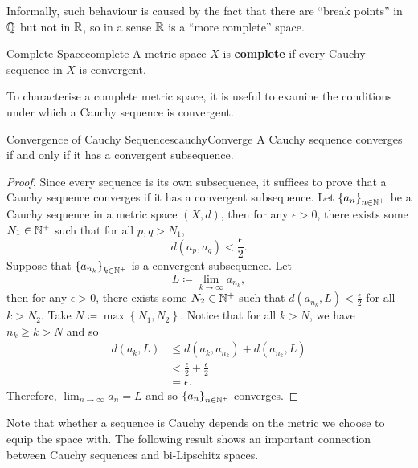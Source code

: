 \documentclass[math]{amznotes}
\theoremstyle{remark}
\begin{document}
Informally, such behaviour is caused by the fact that there are ``break points'' in $\mathbb{Q}$ but not in $\mathbb{R}$, so in a sense $\mathbb{R}$ is a ``more complete'' space.
\begin{dfnbox}{Complete Space}{complete}
    A metric space $X$ is {\color{red} \textbf{complete}} if every Cauchy sequence in $X$ is convergent.
\end{dfnbox}
To characterise a complete metric space, it is useful to examine the conditions under which a Cauchy sequence is convergent. 
\begin{probox}{Convergence of Cauchy Sequences}{cauchyConverge}
    A Cauchy sequence converges if and only if it has a convergent subsequence.
    \tcblower
    \begin{proof}
        Since every sequence is its own subsequence, it suffices to prove that a Cauchy sequence converges if it has a convergent subsequence. Let $\left\{a_n\right\}_{n \in \mathbb{N}^+}$ be a Cauchy sequence in a metric space $\left(X, d\right)$, then for any $\epsilon > 0$, there exists some $N_1 \in \mathbb{N}^+$ such that for all $p, q > N_1$, 
        \begin{equation*}
            d\left(a_p, a_q\right) < \frac{\epsilon}{2}.
        \end{equation*}
        Suppose that $\left\{a_{n_k}\right\}_{k \in \mathbb{N}^+}$ is a convergent subsequence. Let 
        \begin{equation*}
            L \coloneqq \lim_{k \to \infty}a_{n_k},
        \end{equation*}
        then for any $\epsilon > 0$, there exists some $N_2 \in \mathbb{N}^+$ such that $d\left(a_{n_k}, L\right) < \frac{\epsilon}{2}$ for all $k > N_2$. Take $N \coloneqq \max\left\{N_1, N_2\right\}$. Notice that for all $k > N$, we have $n_k \geq k > N$ and so
        \begin{align*}
            d\left(a_k, L\right) & \leq d\left(a_k, a_{n_k}\right) + d\left(a_{n_k}, L\right) \\
            & < \frac{\epsilon}{2} + \frac{\epsilon}{2} \\
            & = \epsilon.
        \end{align*}
        Therefore, $\lim_{n \to \infty}a_n = L$ and so $\left\{a_n\right\}_{n \in \mathbb{N}^+}$ converges.
    \end{proof}
\end{probox}
Note that whether a sequence is Cauchy depends on the metric we choose to equip the space with. The following result shows an important connection between Cauchy sequences and bi-Lipschitz spaces.
\end{document}
